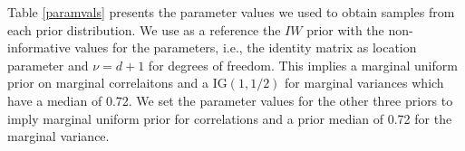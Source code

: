 \documentclass[a4paper]{article}
\begin{document}
Table \ref{paramvals} presents the parameter values we used to obtain samples from each prior distribution. We use as a reference the $IW$ prior with the non-informative values for the parameters, i.e., the identity matrix as location parameter and $\nu=d+1$ for degrees of freedom. This implies a marginal uniform prior on marginal correlaitons and a IG$(1,1/2)$ for marginal variances which have a median of 0.72.  We set the parameter values for the other three priors to imply marginal uniform prior for correlations and a prior median of 0.72 for the marginal variance. 
\end{document}
